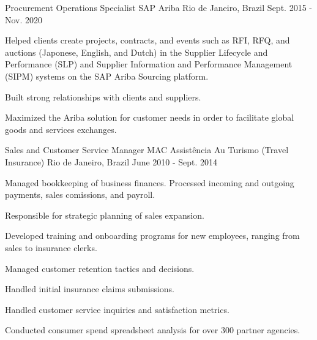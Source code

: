 


\begin{cventries}


\cventry
{Procurement Operations Specialist} %
{SAP Ariba} %
{Rio de Janeiro, Brazil} %
{Sept. 2015 - Nov. 2020} %
{ %
\begin{cvitems}
\item {Helped clients create projects, contracts, and events such as RFI, RFQ, and auctions (Japonese, English, and Dutch)
in the Supplier Lifecycle and Performance (SLP) and Supplier Information and Performance Management (SIPM)
systems on the SAP Ariba Sourcing platform.}
\item {Built strong relationships with clients and suppliers.}
\item {Maximized the Ariba solution for customer needs in order to facilitate global goods and services exchanges.}
\end{cvitems}
}


\cventry
{Sales and Customer Service Manager} %
{MAC Assistência Au Turismo (Travel Insurance)} %
{Rio de Janeiro, Brazil} %
{June 2010 - Sept. 2014} %
{ %
\begin{cvitems}
\item {Managed bookkeeping of business finances. Processed incoming and outgoing payments, sales comissions, and payroll.}
\item {Responsible for strategic planning of sales expansion.}
\item {Developed training and onboarding programs for new employees, ranging from sales to insurance clerks.}
\item {Managed customer retention tactics and decisions.}
\item {Handled initial insurance claims submissions.}
\item {Handled customer service inquiries and satisfaction metrics.}
\item {Conducted consumer spend spreadsheet analysis for over 300 partner agencies.}
\end{cvitems}
}



\end{cventries}
